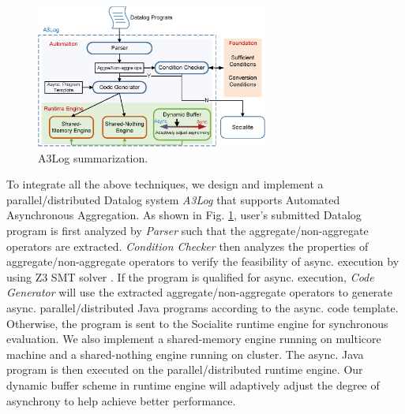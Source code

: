 \begin{figure}[t]
    \centerline{\includegraphics[width=3in]{fig/intro.eps}}
    \caption{A3Log summarization.}
    \label{fig:intro}
\end{figure}


To integrate all the above techniques, we design and implement a parallel/distributed Datalog system \emph{A3Log} that supports Automated Asynchronous Aggregation. As shown in Fig. \ref{fig:intro}, user's submitted Datalog program is first analyzed by \textit{Parser} such that the aggregate/non-aggregate operators are extracted. \textit{Condition Checker} then analyzes the properties of aggregate/non-aggregate operators to verify the feasibility of async. execution by using Z3 SMT solver \cite{}. If the program is qualified for async. execution, \textit{Code Generator} will use the extracted aggregate/non-aggregate operators to generate async. parallel/distributed Java programs according to the async. code template. Otherwise, the program is sent to the Socialite runtime engine for synchronous evaluation. We also implement a shared-memory engine running on multicore machine and a shared-nothing engine running on cluster. The async. Java program is then executed on the parallel/distributed runtime engine. Our dynamic buffer scheme in runtime engine will adaptively adjust the degree of asynchrony to help achieve better performance.


